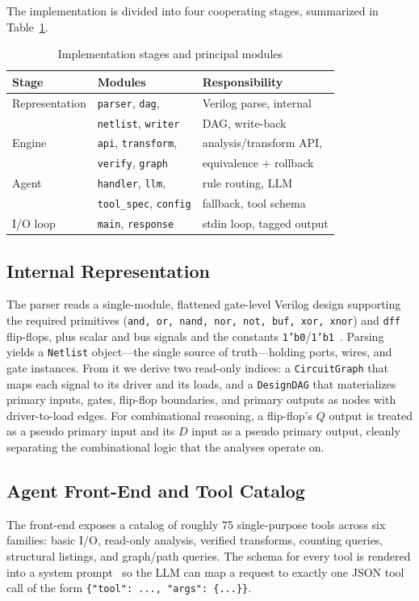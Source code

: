 \documentclass[conference]{IEEEtran}
\begin{document}
The implementation is divided into four cooperating stages, summarized in
Table~\ref{tab:modules}.

\begin{table}[t]
\caption{Implementation stages and principal modules}
\label{tab:modules}
\centering
\begin{tabular}{@{}lll@{}}
\toprule
\textbf{Stage} & \textbf{Modules} & \textbf{Responsibility} \\
\midrule
Representation & \texttt{parser}, \texttt{dag}, & Verilog parse, internal \\
               & \texttt{netlist}, \texttt{writer} & DAG, write-back \\
Engine         & \texttt{api}, \texttt{transform}, & analysis/transform API, \\
               & \texttt{verify}, \texttt{graph}   & equivalence + rollback \\
Agent          & \texttt{handler}, \texttt{llm},   & rule routing, LLM \\
               & \texttt{tool\_spec}, \texttt{config} & fallback, tool schema \\
I/O loop       & \texttt{main}, \texttt{response}  & stdin loop, tagged output \\
\bottomrule
\end{tabular}
\end{table}

\subsection{Internal Representation}
The parser reads a single-module, flattened gate-level Verilog design
supporting the required primitives (\texttt{and, or, nand, nor, not, buf, xor,
xnor}) and \texttt{dff} flip-flops, plus scalar and bus signals and the
constants \texttt{1'b0}/\texttt{1'b1}~\cite{problemA}. Parsing yields a
\texttt{Netlist} object---the single source of truth---holding ports, wires,
and gate instances. From it we derive two read-only indices: a
\texttt{CircuitGraph} that maps each signal to its driver and its loads, and a
\texttt{DesignDAG} that materializes primary inputs, gates, flip-flop
boundaries, and primary outputs as nodes with driver-to-load edges. For
combinational reasoning, a flip-flop's $Q$ output is treated as a pseudo
primary input and its $D$ input as a pseudo primary output, cleanly separating
the combinational logic that the analyses operate on.

\subsection{Agent Front-End and Tool Catalog}
The front-end exposes a catalog of roughly 75 single-purpose tools across six
families: basic I/O, read-only analysis, verified transforms, counting
queries, structural listings, and graph/path queries. The schema for every
tool is rendered into a system prompt~\cite{problemA} so the LLM can map a
request to exactly one JSON tool call of the form
\verb|{"tool": ..., "args": {...}}|.
\end{document}
